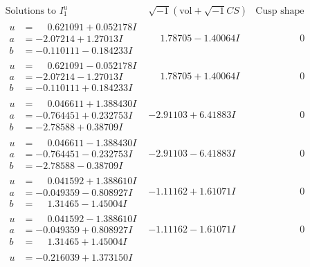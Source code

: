 \documentclass[1p]{elsarticle_modified}
\theoremstyle{definition}
\newcommand{\I}{\sqrt{-1}}
\begin{document}
$$\begin{array}{c|c|c}
\text{Solutions to }I^u_{1}& \I (\text{vol} + \sqrt{-1}CS) & \text{Cusp shape}\\
 \hline 
\begin{aligned}
u &= \phantom{-}0.621091 + 0.052178 I \\
a &= -2.07214 + 1.27013 I \\
b &= -0.110111 - 0.184233 I\end{aligned}
 & \phantom{-}1.78705 - 1.40064 I & \phantom{-0.000000 } 0 \\ \hline\begin{aligned}
u &= \phantom{-}0.621091 - 0.052178 I \\
a &= -2.07214 - 1.27013 I \\
b &= -0.110111 + 0.184233 I\end{aligned}
 & \phantom{-}1.78705 + 1.40064 I & \phantom{-0.000000 } 0 \\ \hline\begin{aligned}
u &= \phantom{-}0.046611 + 1.388430 I \\
a &= -0.764451 + 0.232753 I \\
b &= -2.78588 + 0.38709 I\end{aligned}
 & -2.91103 + 6.41883 I & \phantom{-0.000000 } 0 \\ \hline\begin{aligned}
u &= \phantom{-}0.046611 - 1.388430 I \\
a &= -0.764451 - 0.232753 I \\
b &= -2.78588 - 0.38709 I\end{aligned}
 & -2.91103 - 6.41883 I & \phantom{-0.000000 } 0 \\ \hline\begin{aligned}
u &= \phantom{-}0.041592 + 1.388610 I \\
a &= -0.049359 - 0.808927 I \\
b &= \phantom{-}1.31465 - 1.45004 I\end{aligned}
 & -1.11162 + 1.61071 I & \phantom{-0.000000 } 0 \\ \hline\begin{aligned}
u &= \phantom{-}0.041592 - 1.388610 I \\
a &= -0.049359 + 0.808927 I \\
b &= \phantom{-}1.31465 + 1.45004 I\end{aligned}
 & -1.11162 - 1.61071 I & \phantom{-0.000000 } 0 \\ \hline\begin{aligned}
u &= -0.216039 + 1.373150 I \\

\end{aligned}
\end{array}$$
\end{document}
